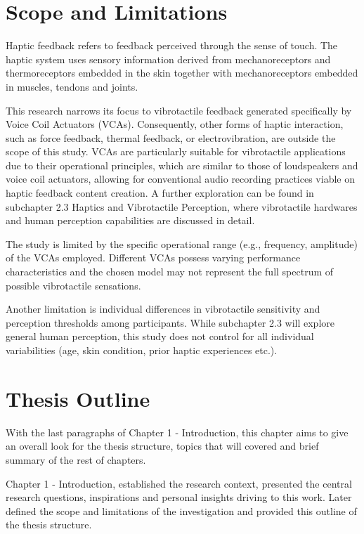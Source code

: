    \section{Scope and Limitations}
        Haptic feedback refers to feedback perceived through the sense of touch. The haptic system uses sensory information derived from mechanoreceptors and thermoreceptors embedded in the skin together with mechanoreceptors embedded in muscles, tendons and joints\cite{Haptic_Perception-A_Tutorial}.\par 

        This research narrows its focus to vibrotactile feedback generated specifically by Voice Coil Actuators (VCAs). Consequently, other forms of haptic interaction, such as force feedback, thermal feedback, or electrovibration, are outside the scope of this study. VCAs are particularly suitable for vibrotactile applications due to their operational principles, which are similar to those of loudspeakers and voice coil actuators\cite{Audio-Tactile_Rendering}, allowing for conventional audio recording practices viable on haptic feedback content creation. A further exploration can be found in subchapter 2.3 Haptics and Vibrotactile Perception, where vibrotactile hardwares and human perception capabilities are discussed in detail.\par 

        The study is limited by the specific operational range (e.g., frequency, amplitude) of the VCAs employed. Different VCAs possess varying performance characteristics and the chosen model may not represent the full spectrum of possible vibrotactile sensations.\par

        Another limitation is individual differences in vibrotactile sensitivity and perception thresholds among participants. While subchapter 2.3 will explore general human perception, this study does not control for all individual variabilities (age, skin condition, prior haptic experiences etc.).\par
    \section{Thesis Outline}
        With the last paragraphs of Chapter 1 - Introduction, this chapter aims to give an overall look for the thesis structure, topics that will covered and brief summary of the rest of chapters.\par

        Chapter 1 - Introduction, established the research context, presented the central research questions, inspirations and personal insights driving to this work. Later defined the scope and limitations of the investigation and provided this outline of the thesis structure.\par

